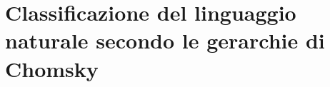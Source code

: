 \section{Classificazione del linguaggio naturale secondo le gerarchie di Chomsky}
\begin{abstract}
L'analisi logica per come la conosciamo non è semplice, non dipende da posizioni (aggettivi prima e dopo il nome) o regole troppo inflessibili... ma anche la stessa tokenizzazione delle 'parole' può presentare problemi ( perchè dividere per spazi? il cinese non divide le parole con spazi ). Invece di cercare una relazione parentetica, guardiamo alle relazioni fra le parole. -> costruzione delle dipendenze
Come definiamo una \textbf{word}?

\begin{Oss}{Esempio:} Il lonfo non vaterca... \end{Oss}
\end{abstract}

